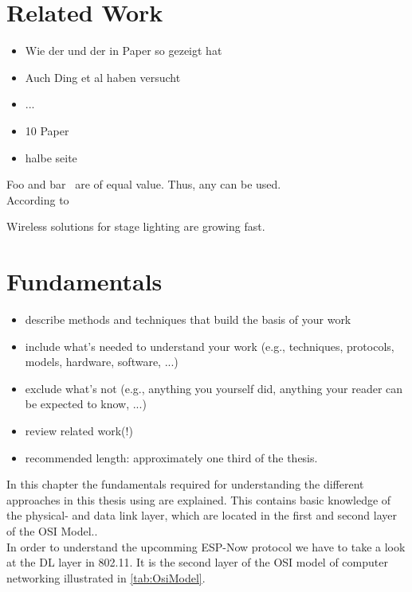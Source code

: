 \documentclass[]{ccs-thesis}
\begin{document}
\chapter{Related Work}
\begin{itemize}
	\item Wie der und der in Paper so gezeigt hat 
	\item Auch Ding et al haben versucht
	\item ...
	\item 10 Paper
	\item halbe seite
\end{itemize}

Foo and bar~\cite{LowCostMicrocontroller} are of equal value. Thus, any can be used.\\
According to~\cite{akyildiz2002survey}

Wireless solutions for stage lighting are growing fast. 


\chapter{Fundamentals}
\label{sec:fundamentals}

\begin{itemize}
	\item describe methods and techniques that build the basis of your work
	\item include what's needed to understand your work (e.g., techniques, protocols, models, hardware, software, ...)
	\item exclude what's not (e.g., anything you yourself did, anything your reader can be expected to know, ...)
	\item review related work(!)
	\item recommended length: approximately one third of the thesis.
\end{itemize}

In this chapter the fundamentals required for understanding the different approaches 
in this thesis using are explained.
This contains basic knowledge of the physical- and data link layer,
which are located in the first and second layer of the \ac{OSI} Model..\\
In order to understand the upcomming ESP-Now protocol we have to take a look at the \ac{DL} layer in 802.11.
It is the second layer of the \ac{OSI} model of computer networking illustrated in \cref{tab:OsiModel}.
\end{document}
